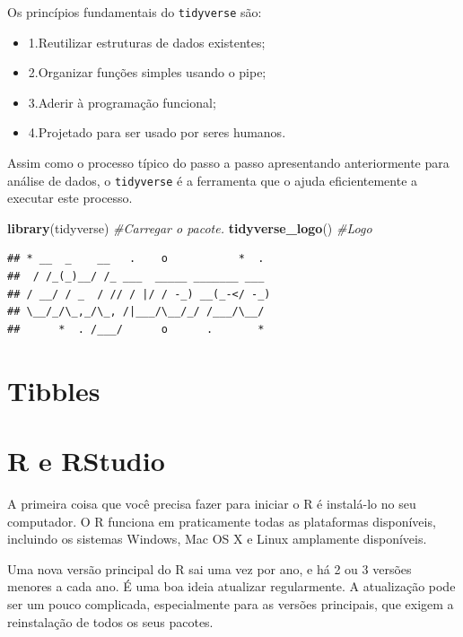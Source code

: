 \documentclass[]{book}
\newenvironment{Shaded}{\begin{snugshade}}{\end{snugshade}}
\newcommand{\CommentTok}[1]{\textcolor[rgb]{0.56,0.35,0.01}{\textit{#1}}}
\newcommand{\KeywordTok}[1]{\textcolor[rgb]{0.13,0.29,0.53}{\textbf{#1}}}
\newcommand{\NormalTok}[1]{#1}
\providecommand{\tightlist}{%
  \setlength{\itemsep}{0pt}\setlength{\parskip}{0pt}}
\begin{document}
Os princípios fundamentais do \texttt{tidyverse} são:

\begin{itemize}
\tightlist
\item
  1.Reutilizar estruturas de dados existentes;
\item
  2.Organizar funções simples usando o pipe;
\item
  3.Aderir à programação funcional;
\item
  4.Projetado para ser usado por seres humanos.
\end{itemize}

Assim como o processo típico do passo a passo apresentando anteriormente para análise de dados, o \texttt{tidyverse} é a ferramenta que o ajuda eficientemente a executar este processo.

\begin{Shaded}
\begin{Highlighting}[]
\KeywordTok{library}\NormalTok{(tidyverse) }\CommentTok{#Carregar o pacote.}
\KeywordTok{tidyverse_logo}\NormalTok{() }\CommentTok{#Logo}
\end{Highlighting}
\end{Shaded}

\begin{verbatim}
## * __  _    __   .    o           *  . 
##  / /_(_)__/ /_ ___  _____ _______ ___ 
## / __/ / _  / // / |/ / -_) __(_-</ -_)
## \__/_/\_,_/\_, /|___/\__/_/ /___/\__/ 
##      *  . /___/      o      .       *
\end{verbatim}

\hypertarget{tibbles}{%
\section{Tibbles}\label{tibbles}}

\hypertarget{r-e-rstudio}{%
\section{R e RStudio}\label{r-e-rstudio}}

A primeira coisa que você precisa fazer para iniciar o R é instalá-lo no seu computador. O R funciona em praticamente todas as plataformas disponíveis, incluindo os sistemas Windows, Mac OS X e Linux amplamente disponíveis.

Uma nova versão principal do R sai uma vez por ano, e há 2 ou 3 versões menores a cada ano. É uma boa ideia atualizar regularmente. A atualização pode ser um pouco complicada, especialmente para as versões principais, que exigem a reinstalação de todos os seus pacotes.
\end{document}
